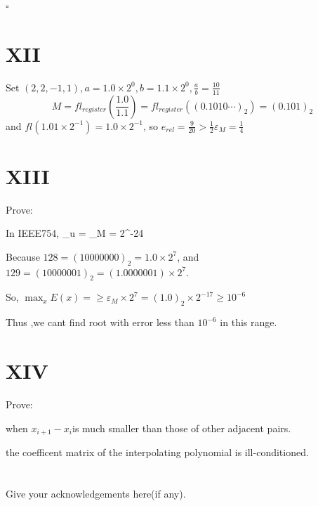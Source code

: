 \documentclass[a4paper]{article}
\begin{document}
\begin{flushright} %
    $\square$ 
\end{flushright} 


\section*{XII}
Set $(2,2,-1,1), a=1.0\times 2^{0}, b = 1.1\times 2^{0}, \frac{a}{b} = \frac{10}{11}$
$$M = fl_{register}(\frac{1.0}{1.1}) = fl_{register}((0.1010\cdots)_{2}) = (0.101)_{2}$$
and $fl(1.01\times 2^{-1}) = 1.0\times 2^{-1}$, so $e_{rel} = \frac{9}{20} > \frac{1}{2}\varepsilon_{M} = \frac{1}{4}$


\section*{XIII}

Prove:

In IEEE754, \varepsilon _{u} = \varepsilon _{M} = 2^{-24}

Because $128 = (10000000)_{2} = 1.0 \times 2^{7}$, and $129 = (10000001)_{2} = (1.0000001) \times 2^{7}$.

So, $\max_{x}E(x) = \geq \varepsilon _{M}\times 2^{7} = (1.0)_{2} \times 2^{-17} \geq 10^{-6}$

Thus ,we cant find root with error less than $10^{-6}$ in this range.

\section*{XIV}
Prove:

when $x_{i+1} - x_{i}$is much smaller than those of other adjacent pairs.

the coefficent matrix of the interpolating polynomial is ill-conditioned.

\section*{  }
Give your acknowledgements here(if any).
\end{document}
